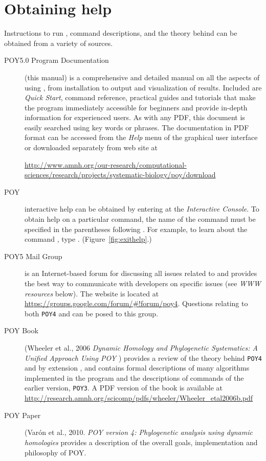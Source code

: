 {\section{Obtaining help} \label{sec:help} 
Instructions to run \poy, command descriptions, and the theory behind \poy can be obtained
from a variety of sources.  

\begin{description} 
\item[POY5.0 Program Documentation] (this manual) is a comprehensive 
and detailed manual on all the aspects of using \poy, from installation to 
output and visualization of results. Included are \emph{Quick Start}, \poy
command reference, practical guides and tutorials that make the
program immediately accessible for beginners and provide in-depth
information for experienced users. As with any PDF, this document 
is easily searched using key words or phrases. The documentation in PDF format
can be accessed from the \emph{Help} menu of the graphical user
interface or downloaded separately from \poy web site at \begin{center}
\url{http://www.amnh.org/our-research/computational-sciences/research/projects/systematic-biology/poy/download}
\end{center} 
\item[POY] interactive help can be obtained by entering
 at the \poy \emph{Interactive Console}.  To
obtain help on a particular command, the name of the command must
be specified in the parentheses following .
For example, to learn about the command , type
.  (Figure~\ref{fig:exithelp}.) 
\item[POY5
Mail Group] is an Internet-based forum for discussing all issues
related to \poy and provides the best way to communicate with \poy
developers on specific issues (see \emph{WWW resources} below). The
website is located at \url{https://groups.google.com/forum/#!forum/poy4}.
Questions relating to both \texttt{POY4} and \poy can be posed to
this group.  
\item[POY Book] (Wheeler et al., 2006 \emph{Dynamic
Homology and Phylogenetic Systematics: A Unified Approach Using
POY} \cite{wheeleretal2006}) provides a review of the theory behind
\texttt{POY4} and by extension \poy, and contains formal descriptions
of many algorithms implemented in the program and the descriptions
of commands of the earlier version, \texttt{POY3}. A PDF version of 
the book is available at \url{http://research.amnh.org/scicomp/pdfs/wheeler/Wheeler_etal2006b.pdf} 
\item[POY Paper] (Var\'on et al., 2010. \emph{POY version 4: 
Phylogenetic analysis using dynamic homologies} \cite{Varonetal2010} 
provides a description of the overall goals, implementation and philosophy 
of POY.


\end{description}}
